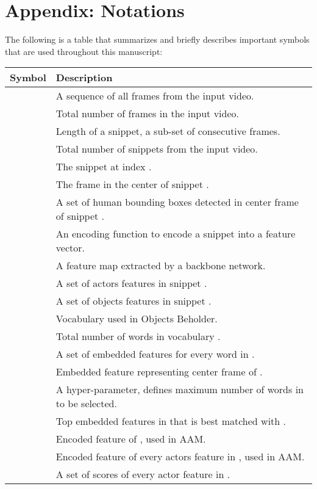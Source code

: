 \documentclass[sn-mathphys]{sn-jnl}
\theoremstyle{thmstyleone}\newtheorem{theorem}{Theorem}\newtheorem{proposition}[theorem]{Proposition}
\theoremstyle{thmstyletwo}\newtheorem{example}{Example}\newtheorem{remark}{Remark}
\theoremstyle{thmstylethree}\newtheorem{definition}{Definition}
\begin{document}
\section*{Appendix: Notations}
The following is a table that summarizes and briefly describes important symbols that are used throughout this manuscript:
\begin{table}[!ht]
\begin{tabular}{c|l}
        Symbol & Description \\ \hline
         & A sequence of all frames from the input video.\\ \hline
         & Total number of frames in the input video.\\ \hline
         & Length of a snippet, a sub-set of consecutive frames. \\ \hline
         & Total number of snippets from the input video.\\ \hline
         & The snippet at index .\\ \hline
         & The frame in the center of snippet .\\ \hline
         & A set of human bounding boxes detected in center frame  of snippet .\\ \hline
         & An encoding function to encode a snippet  into a feature vector.\\ \hline
         & A feature map extracted by a backbone network.\\ \hline
         & A set of actors features in snippet .\\ \hline
         & A set of objects features in snippet .\\ \hline
         & Vocabulary used in Objects Beholder.\\ \hline
         & Total number of words in vocabulary .\\ \hline
         & A set of embedded features for every word in .\\ \hline
         & Embedded feature representing center frame  of .\\ \hline
         & A hyper-parameter, defines maximum number of words in  to be selected.\\ \hline
         & Top  embedded features in  that is best matched with .\\ \hline
         & Encoded feature of , used in AAM.\\ \hline
         & Encoded feature of every actors feature in , used in AAM.\\ \hline
         & A set of scores of every actor feature in .\\ \hline

\end{tabular}
\end{table}
\end{document}
